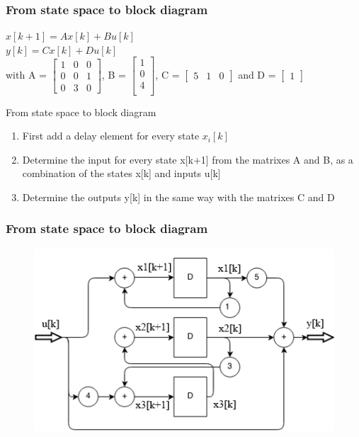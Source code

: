 \begin{frame}
	\frametitle{From state space to block diagram }
		\small{\begin{example}
				\begin{center}
					$x[k+1] = A x[k] + B u[k]$ \\
					$y[k] = C x[k] + D u[k] $ \\
					
					with  A = 
					$\begin{bmatrix}
					1 & 0 & 0 \\
					0 & 0 & 1 \\
					0 & 3 & 0
					\end{bmatrix}$,
					B = 
					$\begin{bmatrix}
					1\\
					0\\
					4\\
					\end{bmatrix}$,
					C = 
					$\begin{bmatrix}
					5 & 1 & 0
					\end{bmatrix}$ 
					and D = 
					$\begin{bmatrix}
					1
					\end{bmatrix}$ \\
				\end{center}
		\end{example} }
		
	\begin{block}{From state space to block diagram }
		\small{
		\begin{enumerate}
			\setlength\itemsep{-0.5em}
			\item First add a delay element for every state $x_i[k]$
			\item 	Determine the input for every state x[k+1] from the matrixes A and B, as a combination of the states x[k] and inputs u[k]
			\item Determine the outputs y[k] in the same way with the matrixes C and D
		\end{enumerate} }
	\end{block}
\end{frame}
\begin{frame}
	\frametitle{From state space to block diagram}
	\begin{figure}
		\centering
		\includegraphics[width=0.7\linewidth]{Images/discrete_time_systems_18}
		\label{fig:discrete_time_systems_18}
	\end{figure}

	
\end{frame}
